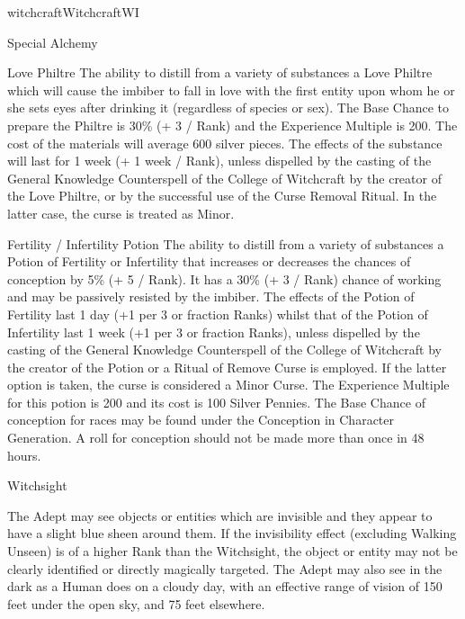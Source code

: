 \begin{college}[1.1]{witchcraft}{Witchcraft}{WI}
\begin{talent}[T-2]{Special Alchemy}
\begin{effects}
\begin{Description}
\item[Love Philtre]
The ability to distill from a variety of substances a Love Philtre
which will cause the imbiber to fall in love with the first entity
upon whom he or she sets eyes after drinking it (regardless of species
or sex).  The Base Chance to prepare the Philtre is 30\% (+ 3 / Rank)
and the Experience Multiple is 200.  The cost of the materials will
average 600 silver pieces.  The effects of the substance will last for
1 week (+ 1 week / Rank), unless dispelled by the casting of the
General Knowledge Counterspell of the College of Witchcraft by the
creator of the Love Philtre, or by the successful use of the Curse
Removal Ritual. In the latter case, the curse is treated as Minor.

\item[Fertility / Infertility Potion] The ability to distill from a
variety of substances a Potion of Fertility or Infertility that
increases or decreases the chances of conception by 5\% (+ 5 / Rank).
It has a 30\% (+ 3 / Rank) chance of working and may be passively
resisted by the imbiber.  The effects of the Potion of Fertility last
1 day (+1 per 3 or fraction Ranks) whilst that of the Potion of
Infertility last 1 week (+1 per 3 or fraction Ranks), unless dispelled
by the casting of the General Knowledge Counterspell of the College of
Witchcraft by the creator of the Potion or a Ritual of Remove Curse is
employed.  If the latter option is taken, the curse is considered a
Minor Curse.  The Experience Multiple for this potion is 200 and its
cost is 100 Silver Pennies.  The Base Chance of conception for races
may be found under the Conception in Character Generation.  A roll for
conception should not be made more than once in 48 hours.
\end{Description}
\end{effects}
\end{talent}

\begin{talent}[T-3]{Witchsight}
\begin{effects}
The Adept may see objects or entities which are invisible and they
appear to have a slight blue sheen around them. If the invisibility
effect (excluding Walking Unseen) is of a higher Rank than the
Witchsight, the object or entity may not be clearly identified or
directly magically targeted. The Adept may also see in the dark as a
Human does on a cloudy day, with an effective range of vision of 150
feet under the open sky, and 75 feet elsewhere.
\end{effects}
\end{talent}


\end{college}
